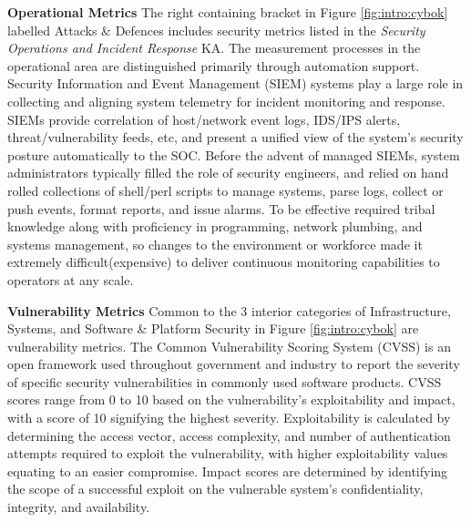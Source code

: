 \textbf{Operational Metrics} The right containing bracket in Figure \ref{fig:intro:cybok} labelled Attacks \& Defences includes security metrics listed in the \textit{Security Operations and Incident Response}\cite{Debar_2019} KA. The measurement processes in the operational area are distinguished primarily through automation support. Security Information and Event Management (SIEM) systems play a large role in collecting and aligning system telemetry for incident monitoring and response. SIEMs provide correlation of host/network event logs, IDS/IPS alerts, threat/vulnerability feeds, etc, and present a unified view of the system’s security posture automatically to the SOC. Before the advent of managed SIEMs, system administrators typically filled the role of security engineers, and relied on hand rolled collections of shell/perl scripts to manage systems, parse logs, collect or push events, format reports, and issue alarms.  To be effective required tribal knowledge along with proficiency in programming, network plumbing, and systems management, so changes to the environment or workforce made it extremely difficult(expensive) to deliver continuous monitoring capabilities to operators at any scale.  


\textbf{Vulnerability Metrics} Common to the 3 interior categories of Infrastructure, Systems, and Software \& Platform Security in Figure \ref{fig:intro:cybok} are vulnerability metrics. The Common Vulnerability Scoring System\cite{Mell07thecommon} (CVSS) is an open framework used throughout government and industry to report the severity of specific security vulnerabilities in commonly used software products. CVSS scores range from 0 to 10 based on the vulnerability’s exploitability and impact, with a score of 10 signifying the highest severity.  Exploitability is calculated by determining the access vector, access complexity, and number of authentication attempts required to exploit the vulnerability, with higher exploitability values equating to an easier compromise. Impact scores are determined by identifying the scope of a successful exploit on the vulnerable system’s confidentiality, integrity, and availability. 


